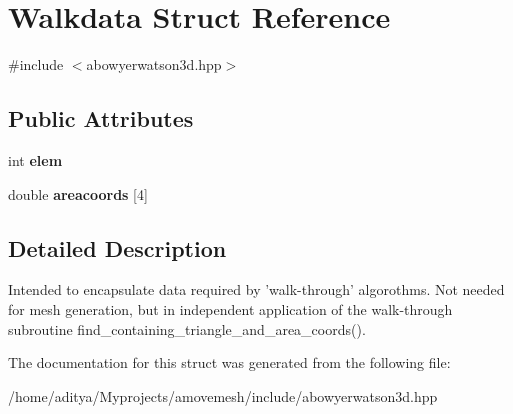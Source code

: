 \hypertarget{structWalkdata}{\section{Walkdata Struct Reference}
\label{structWalkdata}
}


{\ttfamily \#include $<$abowyerwatson3d.\-hpp$>$}

\subsection*{Public Attributes}
\begin{DoxyCompactItemize}
\item 
\hypertarget{structWalkdata_abc428f1b2ffe96bae4a037a6761c957d}{int {\bfseries elem}}\label{structWalkdata_abc428f1b2ffe96bae4a037a6761c957d}

\item 
\hypertarget{structWalkdata_a5943b6067725a8f76e8715c408fd4846}{double {\bfseries areacoords} \mbox{[}4\mbox{]}}\label{structWalkdata_a5943b6067725a8f76e8715c408fd4846}

\end{DoxyCompactItemize}


\subsection{Detailed Description}
Intended to encapsulate data required by 'walk-\/through' algorothms. Not needed for mesh generation, but in independent application of the walk-\/through subroutine find\-\_\-containing\-\_\-triangle\-\_\-and\-\_\-area\-\_\-coords(). 

The documentation for this struct was generated from the following file\-:\begin{DoxyCompactItemize}
\item 
/home/aditya/\-Myprojects/amovemesh/include/abowyerwatson3d.\-hpp\end{DoxyCompactItemize}
